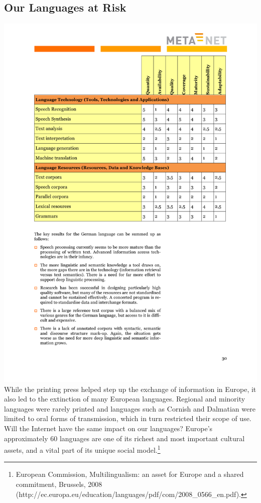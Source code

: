 \documentclass[]{../metanetpaper}
\begin{document}
	\subsection{Our Languages at Risk}
	\includegraphics[scale=0.75]{media/metanet-paper2.pdf} 
\\While the printing press helped step up the exchange of information in Europe, it also led to the extinction of many European languages. Regional and minority languages were rarely printed and languages such as Cornish and Dalmatian were limited to oral forms of transmission, which in turn restricted their scope of use. Will the Internet have the same impact on our languages? Europe’s approximately 60 languages are one of its richest and most important cultural assets, and a vital part of its unique social model.\footnote{European Commission, Multilingualism: an asset for Europe and a shared commitment, Brussels, 2008 (http://ec.europa.eu/education/languages/pdf/com/2008\_0566\_en.pdf).}
\end{document}

